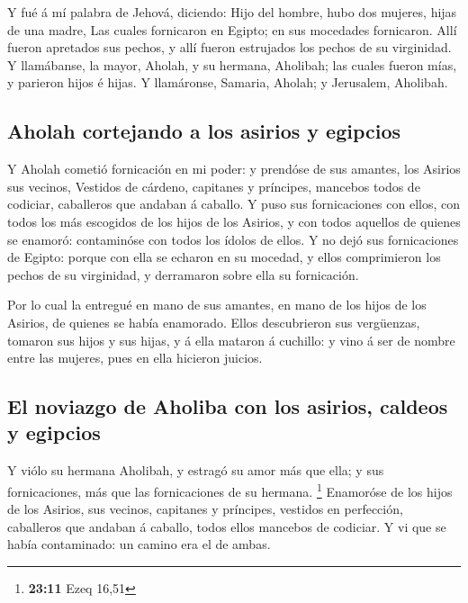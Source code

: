  Y fué á mí palabra de Jehová, diciendo: 
Hijo del hombre, hubo dos mujeres, hijas de una madre, 
Las cuales fornicaron en Egipto; en sus mocedades fornicaron. Allí
fueron apretados sus pechos, y allí fueron estrujados los pechos de su
virginidad.  Y llamábanse, la mayor, Aholah, y su hermana,
Aholibah; las cuales fueron mías, y parieron hijos é hijas. Y
llamáronse, Samaria, Aholah; y Jerusalem, Aholibah.

\hypertarget{aholah-cortejando-a-los-asirios-y-egipcios}{%
\subsection{Aholah cortejando a los asirios y
egipcios}\label{aholah-cortejando-a-los-asirios-y-egipcios}}

 Y Aholah cometió fornicación en mi poder: y prendóse de
sus amantes, los Asirios sus vecinos,  Vestidos de
cárdeno, capitanes y príncipes, mancebos todos de codiciar, caballeros
que andaban á caballo.  Y puso sus fornicaciones con
ellos, con todos los más escogidos de los hijos de los Asirios, y con
todos aquellos de quienes se enamoró: contaminóse con todos los ídolos
de ellos.  Y no dejó sus fornicaciones de Egipto: porque
con ella se echaron en su mocedad, y ellos comprimieron los pechos de su
virginidad, y derramaron sobre ella su fornicación.

 Por lo cual la entregué en mano de sus amantes, en mano
de los hijos de los Asirios, de quienes se había enamorado.
 Ellos descubrieron sus vergüenzas, tomaron sus hijos y
sus hijas, y á ella mataron á cuchillo: y vino á ser de nombre entre las
mujeres, pues en ella hicieron juicios.

\hypertarget{el-noviazgo-de-aholiba-con-los-asirios-caldeos-y-egipcios}{%
\subsection{El noviazgo de Aholiba con los asirios, caldeos y
egipcios}\label{el-noviazgo-de-aholiba-con-los-asirios-caldeos-y-egipcios}}

 Y viólo su hermana Aholibah, y estragó su amor más que
ella; y sus fornicaciones, más que las fornicaciones de su hermana.
\footnote{\textbf{23:11} Ezeq 16,51}  Enamoróse de los
hijos de los Asirios, sus vecinos, capitanes y príncipes, vestidos en
perfección, caballeros que andaban á caballo, todos ellos mancebos de
codiciar.  Y vi que se había contaminado: un camino era
el de ambas.

